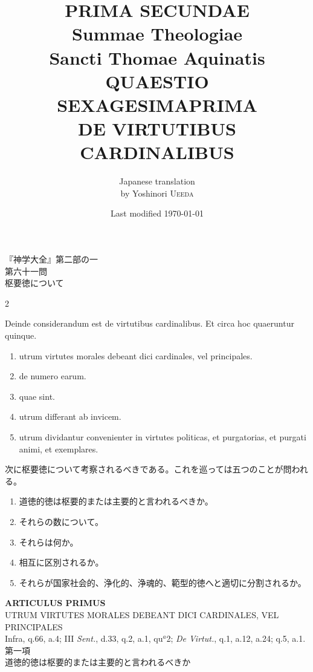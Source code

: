 \documentclass[paper=a4paper,fontsize=10pt,jafontsize=9pt,titlepage]{jlreq}
\title{{\bfseries PRIMA SECUNDAE}\\{\Huge Summae Theologiae}\\Sancti Thomae
Aquinatis\\{\sffamily QUAESTIO SEXAGESIMAPRIMA}\\DE VIRTUTIBUS CARDINALIBUS}
\author{Japanese translation\\by Yoshinori {\scshape Ueeda}}
\date{Last modified \today}
\begin{document}
\maketitle
\thispagestyle{empty}

\begin{center}
{\LARGE 『神学大全』第二部の一}\\
{\Large 第六十一問\\枢要徳について}
\end{center}

\begin{paracol}{2}

Deinde considerandum est de virtutibus cardinalibus. Et circa hoc quaeruntur quinque.  
\begin{enumerate}
 \item utrum virtutes morales debeant dici cardinales, vel principales.
 \item de numero earum.
 \item quae sint.
 \item utrum differant ab invicem.
 \item utrum dividantur convenienter in virtutes politicas, et purgatorias, et purgati animi, et exemplares.
\end{enumerate}

\switchcolumn

次に枢要徳について考察されるべきである。これを巡っては五つのことが問われる。  

\begin{enumerate}
 \item 道徳的徳は枢要的または主要的と言われるべきか。
 \item それらの数について。
 \item それらは何か。
 \item 相互に区別されるか。
 \item それらが国家社会的、浄化的、浄魂的、範型的徳へと適切に分割されるか。
\end{enumerate}

\end{paracol}



\newpage
{}
{}
\setcounter{section}{1}
\setcounter{subsection}{0}



\begin{center}
{\Large {\bfseries ARTICULUS PRIMUS}}\\
{\large UTRUM VIRTUTES MORALES DEBEANT DICI CARDINALES, VEL PRINCIPALES}\\
{\footnotesize Infra, q.66, a.4; III {\itshape Sent.}, d.33, q.2, a.1, qu$^{a}$2; {\itshape De Virtut.}, q.1, a.12, a.24; q.5, a.1.}\\
{\Large 第一項\\道徳的徳は枢要的または主要的と言われるべきか}
\end{center}
\end{document}
